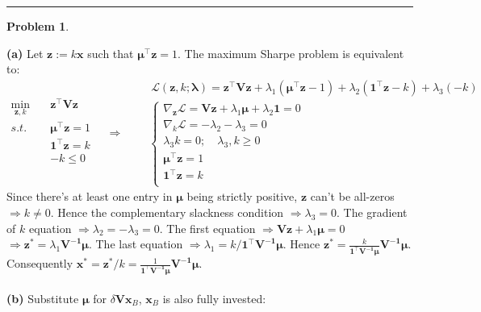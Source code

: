 \documentclass[a4paper, 8pt]{article}
\theoremstyle{definition}
\newtheorem{problem}{Problem}
\theoremstyle{hSol}
\begin{document}
\noindent\rule{16cm}{0.4pt}
\begin{problem}
\end{problem}
\textbf{(a)} Let $\bm{z}:=k \bm{x}$ such that $\bm{\mu}^{\top} \bm{z} = 1$. The maximum Sharpe problem is equivalent to:
	\begin{equation}
		\begin{split}
			\underset{\bm{z}, k}{\min}\quad&  \bm{z}^{\top} \bm{V} \bm{z}\\
			s.t. \quad & \bm{\mu}^{\top} \bm{z} = 1\\
			& \bm{1}^{\top} \bm{z} = k \\
			&-k\leq 0\\
		\end{split}
		\quad\Rightarrow\quad
		\begin{split}
			&~\mathcal{L}(\bm{z}, k; \bm{\lambda}) = \bm{z}^{\top} \bm{V} \bm{z} + \lambda_1(\bm{\mu}^{\top} \bm{z}-1) + \lambda_2(\bm{1}^{\top} \bm{z}-k) + \lambda_3(-k)\\
			&\begin{cases}
			\nabla_{\bm{z}} \mathcal{L} =\bm{V} \bm{z} + \lambda_1 \bm{\mu} + \lambda_2 \bm{1} = 0 \\
			\nabla_{k} \mathcal{L} = -\lambda_2 - \lambda_3 = 0 \\
			\lambda_3 k = 0;\quad \lambda_3, k\geq 0\\
			\bm{\mu}^{\top} \bm{z} = 1\\
			\bm{1}^{\top} \bm{z} = k\\
			\end{cases}
		\end{split}
	\end{equation}
	Since there's at least one entry in $\bm{\mu}$ being strictly positive, $\bm{z}$ can't be all-zeros $\Rightarrow k \ne 0$. Hence the complementary slackness condition $\Rightarrow \lambda_3 = 0$. The gradient of $k$ equation $\Rightarrow \lambda_2 = -\lambda_3 = 0$. The first equation $\Rightarrow \bm{V z} + \lambda_1 \bm{\mu} = 0$ $\Rightarrow \bm{z}^* = \lambda_1 \bm{V^{-1}\mu}$. The last equation $\Rightarrow \lambda_1 = k/\bm{\bm{1}^{\top} V^{-1}\mu}$. Hence $\bm{z}^* = \frac{k}{\bm{1}^{\top}\bm{V^{-1}\mu}}\bm{V^{-1}\mu}$. Consequently $\bm{x}^* = \bm{z}^*/k = \frac{1}{\bm{1}^{\top}\bm{V^{-1}\mu}}\bm{V^{-1}\mu}$. \\
	~\\
	\textbf{(b)} Substitute $\bm{\mu}$ for $\delta \bm{V}\bm{x}_B$, $\bm{x}_B$ is also fully invested:
\end{document}
